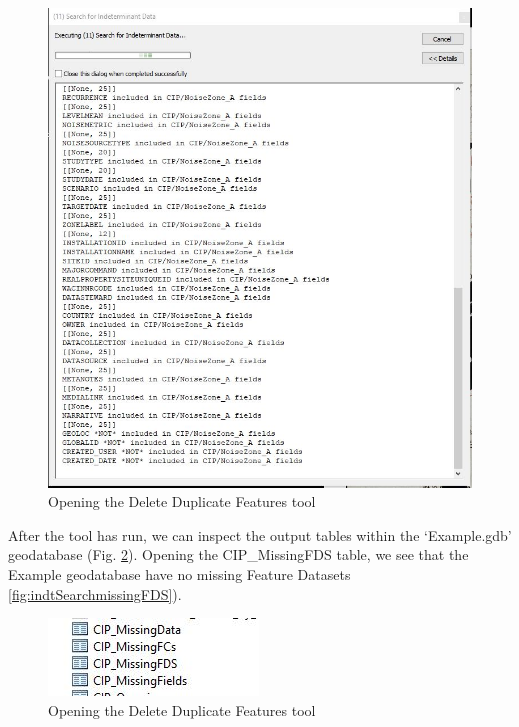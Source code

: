 \documentclass[openany]{book}
\theoremstyle{definition}
\theoremstyle{definition}
\theoremstyle{definition}
\theoremstyle{remark}
\begin{document}
\begin{figure}[H]

{\centering \includegraphics{figures/indtSearch-messages} 

}

\caption{Opening the Delete Duplicate Features tool}\label{fig:indtSearchmessages}
\end{figure}

After the tool has run, we can inspect the output tables within the
`Example.gdb' geodatabase (Fig. \ref{fig:indtSearchtables}). Opening the
CIP\_MissingFDS table, we see that the Example geodatabase have no
missing Feature Datasets \ref{fig:indtSearchmissingFDS}).

\begin{figure}[H]

{\centering \includegraphics{figures/indtSearch-tables} 

}

\caption{Opening the Delete Duplicate Features tool}\label{fig:indtSearchtables}
\end{figure}
\end{document}

